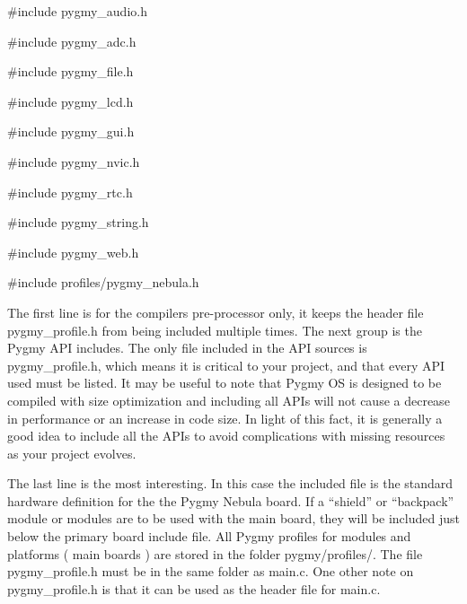 \documentclass{article}
\begin{document}
\#include {\textquotedbl}pygmy\_audio.h{\textquotedbl}

\#include {\textquotedbl}pygmy\_adc.h{\textquotedbl}

\#include {\textquotedbl}pygmy\_file.h{\textquotedbl}

\#include {\textquotedbl}pygmy\_lcd.h{\textquotedbl}

\#include {\textquotedbl}pygmy\_gui.h{\textquotedbl}

\#include {\textquotedbl}pygmy\_nvic.h{\textquotedbl}

\#include {\textquotedbl}pygmy\_rtc.h{\textquotedbl}

\#include {\textquotedbl}pygmy\_string.h{\textquotedbl}

\#include {\textquotedbl}pygmy\_web.h{\textquotedbl}


\bigskip

\#include {\textquotedbl}profiles/pygmy\_nebula.h{\textquotedbl}


\bigskip

The first line is for the compiler{\textquotesingle}s pre-processor only, it keeps the header file {\textquotesingle}pygmy\_profile.h{\textquotesingle} from being included multiple times. The next group is the Pygmy API includes. The only file included in the API sources is {\textquotesingle}pygmy\_profile.h{\textquotesingle}, which means it is critical to your project, and that every API used must be listed. It may be useful to note that Pygmy OS is designed to be compiled with size optimization and including all APIs will not cause a decrease in performance or an increase in code size. In light of this fact, it is generally a good idea to include all the APIs to avoid complications with missing resources as your project evolves.

The last line is the most interesting. In this case the included file is the standard hardware definition for the the Pygmy Nebula board. If a {\textquotedblleft}shield{\textquotedblright} or {\textquotedblleft}backpack{\textquotedblright} module or modules are to be used with the main board, they will be included just below the primary board include file. All Pygmy profiles for modules and platforms ( main boards ) are stored in the folder {\textquotesingle}pygmy/profiles/{\textquotesingle}. The file {\textquotesingle}pygmy\_profile.h{\textquotesingle} must be in the same folder as {\textquotesingle}main.c{\textquotesingle}. One other note on {\textquotesingle}pygmy\_profile.h{\textquotesingle} is that it can be used as the header file for {\textquotesingle}main.c{\textquotesingle}.
\end{document}
